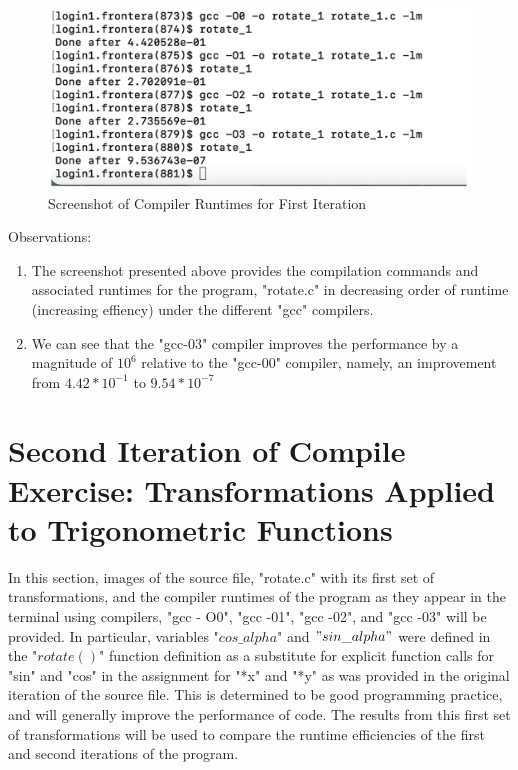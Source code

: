 \documentclass{article}
\begin{document}

\begin{figure}[!h]
    \centering
\includegraphics[scale=0.20]{graphics_hw4/compilation_runtimes_first_iteration.png}
    \caption{Screenshot of Compiler Runtimes for First Iteration}
    \label{fig:my_label}
\end{figure}
\pagebreak


Observations:
\begin{enumerate}
    \label{sec:math}
    \item The screenshot presented above provides the compilation commands and associated runtimes for the program, "rotate.c" in decreasing order of runtime (increasing effiency) under the different "gcc" compilers.
    \item We can see that the "gcc-03" compiler improves the performance by a magnitude of $10^{6}$ relative to the "gcc-00" compiler, namely, an improvement from $4.42*10^{-1}$ to $9.54*10^{-7}$
    
\end{enumerate}
\pagebreak


\section{Second Iteration of Compile Exercise: Transformations Applied to Trigonometric Functions}

In this section, images of the source file, "rotate.c" with its first set of transformations, and the compiler runtimes of the program as they appear in the terminal using compilers, "gcc - O0", "gcc -01", "gcc -02", and "gcc -03" will be provided. In particular, variables "$cos\_alpha$" and $"sin\_alpha"$ were defined in the "$rotate()$" function definition as a substitute for explicit function calls for "sin" and "cos" in the assignment for "*x" and "*y" as was provided in the original iteration of the source file. This is determined to be good programming practice, and will generally improve the performance of code. The results from this first set of transformations will be used to compare the runtime efficiencies of the first and second iterations of the program.
\end{document}
